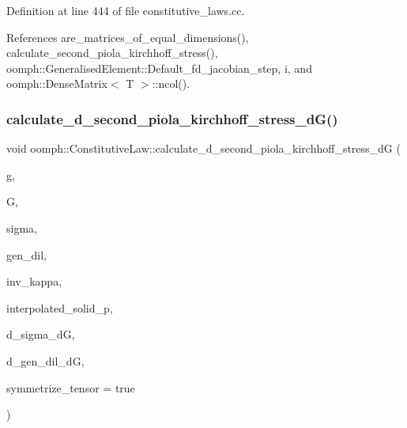 Definition at line 444 of file constitutive\+\_\+laws.\+cc.



References are\+\_\+matrices\+\_\+of\+\_\+equal\+\_\+dimensions(), calculate\+\_\+second\+\_\+piola\+\_\+kirchhoff\+\_\+stress(), oomph\+::\+Generalised\+Element\+::\+Default\+\_\+fd\+\_\+jacobian\+\_\+step, i, and oomph\+::\+Dense\+Matrix$<$ T $>$\+::ncol().

\mbox{\label{classoomph_1_1ConstitutiveLaw_a8a4f1bcac8d308d9ad0013ddf5def505}} 
\subsubsection{\texorpdfstring{calculate\+\_\+d\+\_\+second\+\_\+piola\+\_\+kirchhoff\+\_\+stress\+\_\+d\+G()}{calculate\_d\_second\_piola\_kirchhoff\_stress\_dG()}\hspace{0.1cm}{\footnotesize\ttfamily [3/3]}}
{\footnotesize\ttfamily void oomph\+::\+Constitutive\+Law\+::calculate\+\_\+d\+\_\+second\+\_\+piola\+\_\+kirchhoff\+\_\+stress\+\_\+dG (\begin{DoxyParamCaption}\item[{const \hyperlink{classoomph_1_1DenseMatrix}{Dense\+Matrix}$<$ double $>$ \&}]{g,  }\item[{const \hyperlink{classoomph_1_1DenseMatrix}{Dense\+Matrix}$<$ double $>$ \&}]{G,  }\item[{const \hyperlink{classoomph_1_1DenseMatrix}{Dense\+Matrix}$<$ double $>$ \&}]{sigma,  }\item[{const double \&}]{gen\+\_\+dil,  }\item[{const double \&}]{inv\+\_\+kappa,  }\item[{const double \&}]{interpolated\+\_\+solid\+\_\+p,  }\item[{\hyperlink{classoomph_1_1RankFourTensor}{Rank\+Four\+Tensor}$<$ double $>$ \&}]{d\+\_\+sigma\+\_\+dG,  }\item[{\hyperlink{classoomph_1_1DenseMatrix}{Dense\+Matrix}$<$ double $>$ \&}]{d\+\_\+gen\+\_\+dil\+\_\+dG,  }\item[{const bool \&}]{symmetrize\+\_\+tensor = {\ttfamily true} }\end{DoxyParamCaption})\hspace{0.3cm}{\ttfamily [virtual]}}



